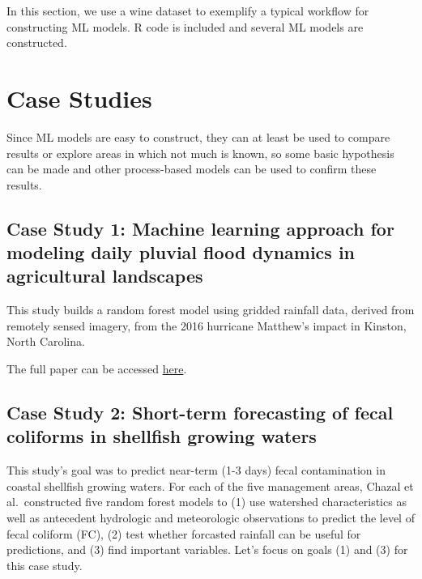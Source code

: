 \documentclass[
]{book}
\begin{document}
In this section, we use a wine dataset to exemplify a typical workflow for constructing ML models. R code is included and several ML models are constructed.

\hypertarget{case-studies}{%
\chapter{Case Studies}\label{case-studies}}

Since ML models are easy to construct, they can at least be used to compare results or explore areas in which not much is known, so some basic hypothesis can be made and other process-based models can be used to confirm these results.

\hypertarget{case-study-1-machine-learning-approach-for-modeling-daily-pluvial-flood-dynamics-in-agricultural-landscapes}{%
\section{Case Study 1: Machine learning approach for modeling daily pluvial flood dynamics in agricultural landscapes}\label{case-study-1-machine-learning-approach-for-modeling-daily-pluvial-flood-dynamics-in-agricultural-landscapes}}

This study builds a random forest model using gridded rainfall data, derived from remotely sensed imagery, from the 2016 hurricane Matthew's impact in Kinston, North Carolina.

The full paper can be accessed \href{https://www.sciencedirect.com/science/article/pii/S1364815223001445?dgcid=author}{here}.

\hypertarget{case-study-2-short-term-forecasting-of-fecal-coliforms-in-shellfish-growing-waters}{%
\section{Case Study 2: Short-term forecasting of fecal coliforms in shellfish growing waters}\label{case-study-2-short-term-forecasting-of-fecal-coliforms-in-shellfish-growing-waters}}

This study's goal was to predict near-term (1-3 days) fecal contamination in coastal shellfish growing waters. For each of the five management areas, Chazal et al.~constructed five random forest models to (1) use watershed characteristics as well as antecedent hydrologic and meteorologic observations to predict the level of fecal coliform (FC), (2) test whether forcasted rainfall can be useful for predictions, and (3) find important variables. Let's focus on goals (1) and (3) for this case study.
\end{document}
